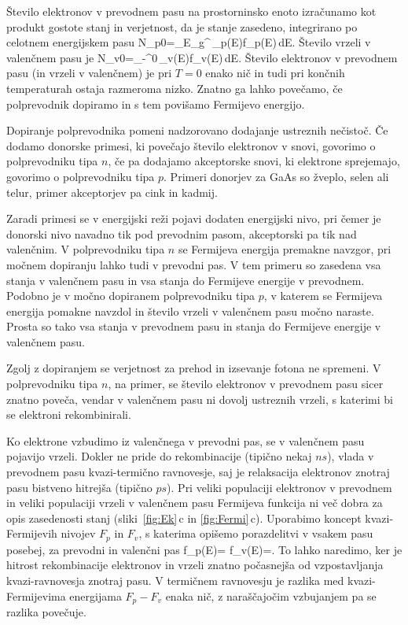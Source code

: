 Število elektronov v prevodnem pasu na prostorninsko enoto izračunamo kot 
produkt gostote stanj in verjetnost, da je stanje zasedeno, integrirano po 
celotnem energijskem pasu
\beq
N_{p0}=\int_{E_g}^{\infty}\,\rho_p(E)f_p(E)\,dE.
\label{6.3a}
\eeq
Število vrzeli v valenčnem pasu je 
\beq
N_{v0}=\int_{-\infty}^{0}\,\rho_v(E)f_v(E)\,dE.
\label{6.3b}
\eeq
Število elektronov v prevodnem pasu (in vrzeli v valenčnem) je pri
$T=0$ enako nič in tudi pri končnih temperaturah ostaja razmeroma nizko. 
Znatno ga lahko povečamo, če polprevodnik dopiramo in s tem povišamo 
Fermijevo energijo.

Dopiranje polprevodnika pomeni nadzorovano dodajanje ustreznih nečistoč. 
Če dodamo donorske primesi, ki povečajo število elektronov v snovi, 
govorimo o polprevodniku tipa $n$, če pa dodajamo akceptorske snovi, ki 
elektrone sprejemajo, govorimo o polprevodniku tipa $p$. 
Primeri donorjev za GaAs so žveplo, selen ali telur,
primer akceptorjev pa cink in kadmij. 

Zaradi primesi se v energijski 
reži pojavi dodaten energijski nivo, pri čemer je donorski nivo navadno 
tik pod prevodnim pasom, akceptorski pa tik nad valenčnim. V polprevodniku tipa $n$ se
Fermijeva energija premakne navzgor, pri močnem dopiranju lahko tudi v 
prevodni pas. V tem primeru so zasedena vsa stanja v valenčnem pasu in vsa
stanja do Fermijeve energije v prevodnem. Podobno je v močno dopiranem polprevodniku tipa 
$p$, v katerem se Fermijeva energija pomakne navzdol in število vrzeli v valenčnem 
pasu močno naraste. Prosta so tako vsa stanja v prevodnem pasu in stanja do 
Fermijeve energije v valenčnem pasu.

\begin{remark}
 Zgolj z dopiranjem se verjetnost za prehod in izsevanje fotona ne spremeni. V
 polprevodniku tipa $n$, na primer, se število elektronov v prevodnem pasu sicer znatno poveča, 
 vendar v valenčnem pasu ni dovolj ustreznih vrzeli, s katerimi bi se elektroni rekombinirali.
\end{remark}

Ko elektrone vzbudimo iz valenčnega v prevodni pas, se v valenčnem pasu pojavijo
vrzeli. Dokler ne pride do rekombinacije (tipično nekaj $\si{ns}$),
vlada v prevodnem pasu kvazi-termično ravnovesje, saj je relaksacija 
elektronov znotraj pasu bistveno hitrejša (tipično $\si{ps}$). 
Pri veliki populaciji elektronov v prevodnem in veliki populaciji vrzeli v 
valenčnem pasu Fermijeva funkcija ni več dobra za opis zasedenosti stanj 
(sliki~\ref{fig:Ek}\,c in \ref{fig:Fermi}\,c). Uporabimo 
koncept kvazi-Fermijevih nivojev $F_p$ in $F_v$, s katerima opišemo porazdelitvi
v vsakem pasu posebej, za prevodni in valenčni pas
\beq
f_p(E)= \qquad {} \qquad 
f_v(E)=.
\eeq
To lahko naredimo, ker je hitrost rekombinacije elektronov in vrzeli znatno počasnejša
od vzpostavljanja kvazi-ravnovesja znotraj pasu. V termičnem ravnovesju je razlika med 
kvazi-Fermijevima energijama $F_{p}-F_v$ enaka nič, z naraščajočim vzbujanjem pa se 
razlika povečuje.

